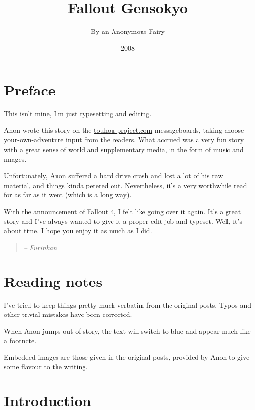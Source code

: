 \documentclass[a4paper,12pt]{book}
\begin{document}
\frontmatter

\title{Fallout Gensokyo}
\author{By an Anonymous Fairy}
\date{2008}
\maketitle


\tableofcontents


\chapter{Preface}

This isn't mine, I'm just typesetting and editing.

Anon wrote this story on the \url{touhou-project.com} messageboards, taking
choose-your-own-adventure input from the readers. What accrued was a very fun
story with a great sense of world and supplementary media, in the form of music
and images.

Unfortunately, Anon suffered a hard drive crash and lost a lot of his raw
material, and things kinda petered out. Nevertheless, it's a very worthwhile
read for as far as it went (which is a long way).

With the announcement of Fallout 4, I felt like going over it again.  It's a
great story and I've always wanted to give it a proper edit job and typeset.
Well, it's about time. I hope you enjoy it as much as I did.

\begin{quote}
\emph{-- Furinkan}
\end{quote}



\chapter{Reading notes}

I've tried to keep things pretty much verbatim from the original posts. Typos and other trivial mistakes have been corrected.

When Anon jumps out of story, the text will switch to {\color{MidnightBlue} blue} and appear much like a footnote.

Embedded images are those given in the original posts, provided by Anon to give some flavour to the writing.



\mainmatter

\chapter{Introduction}
\end{document}
